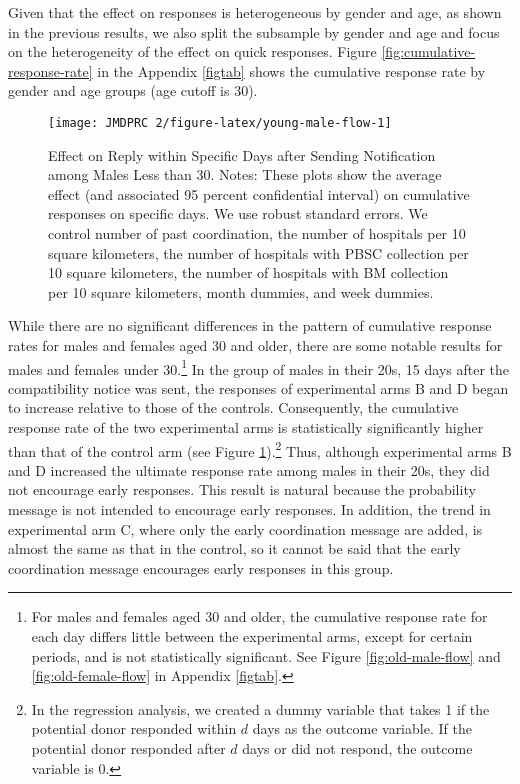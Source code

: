 \documentclass[12pt, a4paper]{article}
\begin{document}
Given that the effect on responses is heterogeneous by gender and age, as shown in the previous results, we also split the subsample by gender and age and focus on the heterogeneity of the effect on quick responses. Figure \ref{fig:cumulative-response-rate} in the Appendix \ref{figtab} shows the cumulative response rate by gender and age groups (age cutoff is 30).

\begin{figure}[t]
\texttt{[image: JMDPRC~2/figure-latex/young-male-flow-1]} \caption{Effect on Reply within Specific Days after Sending Notification among Males Less than 30. Notes: These plots show the average effect (and associated 95 percent confidential interval) on cumulative responses on specific days. We use robust standard errors. We control number of past coordination, the number of hospitals per 10 square kilometers, the number of hospitals with PBSC collection per 10 square kilometers, the number of hospitals with BM collection per 10 square kilometers, month dummies, and week dummies.}\label{fig:young-male-flow}
\end{figure}

While there are no significant differences in the pattern of cumulative response rates for males and females aged 30 and older, there are some notable results for males and females under 30.\footnote{For males and females aged 30 and older, the cumulative response rate for each day differs little between the experimental arms, except for certain periods, and is not statistically significant. See Figure \ref{fig:old-male-flow} and \ref{fig:old-female-flow} in Appendix \ref{figtab}.} In the group of males in their 20s, 15 days after the compatibility notice was sent, the responses of experimental arms B and D began to increase relative to those of the controls. Consequently, the cumulative response rate of the two experimental arms is statistically significantly higher than that of the control arm (see Figure \ref{fig:young-male-flow}).\footnote{In the regression analysis, we created a dummy variable that takes 1 if the potential donor responded within \(d\) days as the outcome variable. If the potential donor responded after \(d\) days or did not respond, the outcome variable is 0.} Thus, although experimental arms B and D increased the ultimate response rate among males in their 20s, they did not encourage early responses. This result is natural because the probability message is not intended to encourage early responses. In addition, the trend in experimental arm C, where only the early coordination message are added, is almost the same as that in the control, so it cannot be said that the early coordination message encourages early responses in this group.
\end{document}
